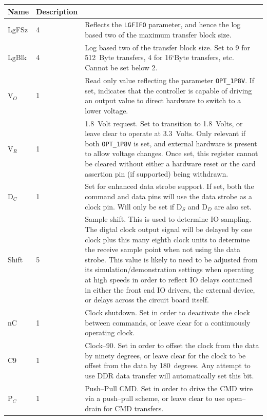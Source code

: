 \documentclass{gqtekspec}
\begin{document}
\begin{table}\begin{center}
\begin{tabular}{|p{1.2in}|p{0.5in}|p{4.0in}|}\hline
	\rowcolor[gray]{0.85} Name & Description\\\hline\hline
LgFSz & 4 & Reflects the {\tt LGFIFO} parameter, and hence the log based two
	of the maximum transfer block size. \\
LgBlk & 4 & Log based two of the transfer block size.  Set to 9 for 512~Byte
	transfers, 4 for 16`Byte transfers, etc.  Cannot be set below 2.\\
%
V$_O$ & 1 & Read only value reflecting the parameter {\tt OPT\_1P8V}.  If set,
	indicates that the controller is capable of driving an output value
	to direct hardware to switch to a lower voltage.\\
V$_R$ & 1 & 1.8~Volt request.  Set to transition to 1.8~Volts, or leave clear
	to operate at 3.3~Volts.  Only relevant if both {\tt OPT\_1P8V} is set,
	and external hardware is present to allow voltage changes.  Once set,
	this register cannot be cleared without either a hardware reset or
	the card assertion pin (if supported) being withdrawn. \\
D$_C$ & 1 & Set for enhanced data strobe support.  If set, both the command
	and data pins will use the data strobe as a clock pin.  Will only
	be set if D$_S$ and D$_D$ are also set.
	\\
Shift & 5 & Sample shift.  This is used to determine IO sampling.  The digtal
	clock output signal will be delayed by one clock plus this many
	eighth clock units to determine the receive sample point when not
	using the data strobe.  This value is likely to need to be adjusted
	from its simulation/demonstration settings when operating at high speeds
	in order to reflect IO delays contained in either the front end IO
	drivers, the external device, or delays across the circuit board
	itself. \\
%
nC & 1 & Clock shutdown.  Set in order to deactivate the clock between commands,
	or leave clear for a continuously operating clock.\\
C9 & 1 & Clock--90.  Set in order to offset the clock from the data by
	ninety degrees, or leave clear for the clock to be offset from the
	data by 180~degrees.  Any attempt to use DDR data transfer will
	automatically set this bit.\\
P$_C$ & 1 & Push--Pull CMD.  Set in order to drive the CMD wire via a
	push--pull scheme, or leave clear to use open--drain for CMD transfers.

\end{tabular}
\end{center}
\end{table}
\end{document}
